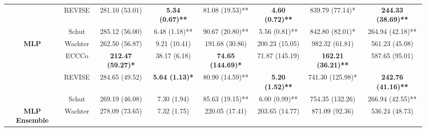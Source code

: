 \begin{table}
{\begin{tabular}[t]{>{}cccccccc}
 & REVISE & 281.10 (53.01) & \textbf{5.34 (0.67)**} & 81.08 (19.53)** & \textbf{4.60 (0.72)**} & 839.79 (77.14)* & \textbf{244.33 (38.69)**}\\

 & Schut & 285.12 (56.00) & 6.48 (1.18)** & 90.67 (20.80)** & 5.56 (0.81)** & 842.80 (82.01)* & 264.94 (42.18)**\\

\multirow{-4}{*}{\centering\arraybackslash \textbf{MLP}} & Wachter & 262.50 (56.87) & 9.21 (10.41) & 191.68 (30.86) & 200.23 (15.05) & 982.32 (61.81) & 561.23 (45.08)\\
\cmidrule{1-8}
 & ECCCo & \textbf{212.47 (59.27)*} & 38.17 (6.18) & \textbf{74.65 (144.69)*} & 71.87 (145.19) & \textbf{162.21 (36.21)**} & 587.65 (95.01)\\

 & REVISE & 284.65 (49.52) & \textbf{5.64 (1.13)*} & 80.90 (14.59)** & \textbf{5.20 (1.52)**} & 741.30 (125.98)* & \textbf{242.76 (41.16)**}\\

 & Schut & 269.19 (46.08) & 7.30 (1.94) & 85.63 (19.15)** & 6.00 (0.99)** & 754.35 (132.26) & 266.94 (42.55)**\\

\multirow{-4}{*}{\centering\arraybackslash \textbf{MLP Ensemble}} & Wachter & 278.09 (73.65) & 7.32 (1.75) & 220.05 (17.41) & 203.65 (14.77) & 871.09 (92.36) & 536.24 (48.73)\\
\bottomrule
\end{tabular}}
\end{table}
